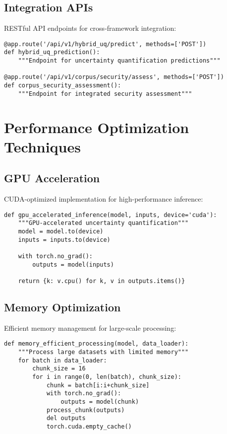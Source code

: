 \documentclass[11pt,a4paper]{article}
\begin{document}
\subsection{Integration APIs}
\label{subsec:integration_apis}

RESTful API endpoints for cross-framework integration:

\begin{lstlisting}[caption=Integration API Endpoints,captionpos=b]
@app.route('/api/v1/hybrid_uq/predict', methods=['POST'])
def hybrid_uq_prediction():
    """Endpoint for uncertainty quantification predictions"""

@app.route('/api/v1/corpus/security/assess', methods=['POST'])
def corpus_security_assessment():
    """Endpoint for integrated security assessment"""
\end{lstlisting}

\section{Performance Optimization Techniques}
\label{appendix:performance_optimization}

\subsection{GPU Acceleration}
\label{subsec:gpu_acceleration}

CUDA-optimized implementation for high-performance inference:

\begin{lstlisting}[caption=GPU Acceleration Implementation,captionpos=b]
def gpu_accelerated_inference(model, inputs, device='cuda'):
    """GPU-accelerated uncertainty quantification"""
    model = model.to(device)
    inputs = inputs.to(device)

    with torch.no_grad():
        outputs = model(inputs)

    return {k: v.cpu() for k, v in outputs.items()}
\end{lstlisting}

\subsection{Memory Optimization}
\label{subsec:memory_optimization}

Efficient memory management for large-scale processing:

\begin{lstlisting}[caption=Memory Optimization Techniques,captionpos=b]
def memory_efficient_processing(model, data_loader):
    """Process large datasets with limited memory"""
    for batch in data_loader:
        chunk_size = 16
        for i in range(0, len(batch), chunk_size):
            chunk = batch[i:i+chunk_size]
            with torch.no_grad():
                outputs = model(chunk)
            process_chunk(outputs)
            del outputs
            torch.cuda.empty_cache()
\end{lstlisting}



\end{document}
